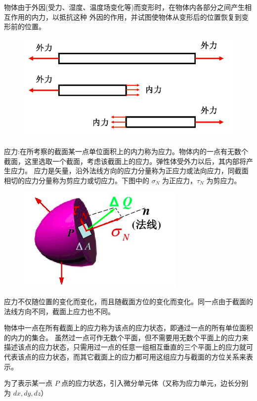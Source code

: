 \documentclass[12pt,a4paper]{article}
\begin{document}
物体由于外因(受力、湿度、温度场变化等)而变形时，在物体内各部分之间产生相互作用的内力，以抵抗这种
外因的作用，并试图使物体从变形后的位置恢复到变形前的位置。

\begin{figure}[H]
\centering
\includegraphics[scale=0.4]{./figures/1.png}
\caption{}
\end{figure}

应力:在所考察的截面某一点单位面积上的内力称为应力。物体内的一点有无数个截面，这里选取一个截面，考虑该截面上的应力。弹性体受外力以后，其内部将产生应力。
应力是矢量，沿外法线方向的应力分量称为正应力或法向应力，同截面相切的应力分量称为剪应力或切应力。下图中的 $\sigma _N$ 为正应力，$\tau _N$ 为剪应力。

\begin{figure}[H]
\centering
\includegraphics[scale=0.5]{./figures/2.png}
\caption{}
\end{figure}

应力不仅随位置的变化而变化，而且随截面方位的变化而变化。同一点由于截面的法线方向不同，截面上应力也不同。

物体中一点在所有截面上的应力称为该点的应力状态，即通过一点的所有单位面积的内力的集合。
虽然过一点可作无数个平面，但不需要用无数个平面上的应力来描述该点的应力状态，只需用过一点的任意一组相互垂直的三个平面上的应力就可代表该点的应力状态，而其它截面上的应力都可用这组应力与截面的方位关系来表示。

为了表示某一点 $P$ 点的应力状态，引入微分单元体（又称为应力单元，边长分别为 $dx,dy,dz$）
\end{document}
